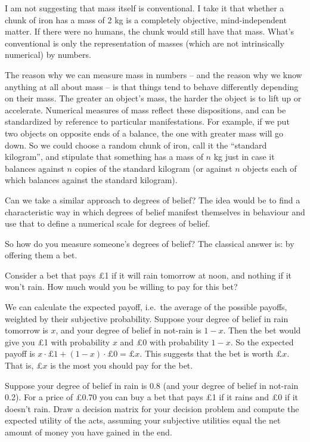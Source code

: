 I am not suggesting that mass itself is conventional. I take it that whether a chunk
of iron has a mass of 2 kg is a completely objective, mind-independent
matter. If there were no humans, the chunk would still have that
mass. What's conventional is only the representation of masses (which
are not intrinsically numerical) by numbers.

The reason why we can measure mass in numbers -- and the reason why we
know anything at all about mass -- is that things tend to behave
differently depending on their mass. The greater an object's mass, the
harder the object is to lift up or accelerate. Numerical measures of
mass reflect these dispositions, and can be standardized by reference
to particular manifestations. For example, if we put two objects on
opposite ends of a balance, the one with greater mass will go down. So
we could choose a random chunk of iron, call it the ``standard
kilogram'', and stipulate that something has a mass of $n$ kg just in
case it balances against $n$ copies of the standard kilogram (or
against $n$ objects each of which balances against the standard
kilogram).

Can we take a similar approach to degrees of belief? The idea would be
to find a characteristic way in which degrees of belief manifest
themselves in behaviour and use that to define a numerical scale for
degrees of belief.

So how do you measure someone's degrees of belief? The classical
answer is: by offering them a bet. 

Consider a bet that pays £1 if it will rain tomorrow at noon, and
nothing if it won't rain. How much would you be willing to pay for
this bet?

We can calculate the expected payoff, i.e.\ the average of the
possible payoffs, weighted by their subjective probability.  Suppose
your degree of belief in rain tomorrow is $x$, and your degree of
belief in not-rain is $1-x$. Then the bet would give you £1 with
probability $x$ and £0 with probability $1-x$. So the expected payoff
is $x \cdot \text{£1} + (1-x) \cdot \text{£0} = \text{£}x$. This
suggests that the bet is worth £$x$. That is, £$x$ is the most you
should pay for the bet.

\begin{exercise}
  Suppose your degree of belief in rain is $0.8$ (and your degree of
  belief in not-rain 0.2). For a price of £0.70 you can buy a bet that
  pays £1 if it rains and £0 if it doesn't rain. Draw a decision
  matrix for your decision problem and compute the expected utility of
  the acts, assuming your subjective utilities equal the net amount of
  money you have gained in the end.
\end{exercise}

